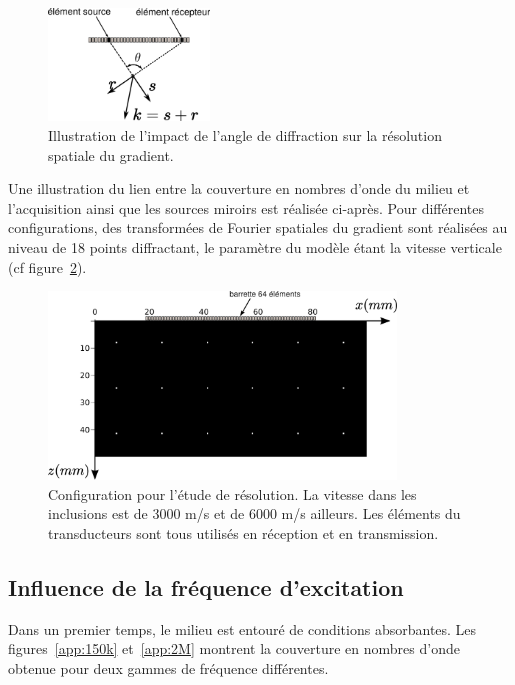 \begin{figure}[!h]
	\centering
	\includegraphics[height=3cm]{img/reso.png}
	\caption{Illustration de l'impact de l'angle de diffraction sur la résolution spatiale du gradient.\label{app:k1}}
\end{figure}


Une illustration du lien entre la couverture en nombres d'onde du milieu et l'acquisition ainsi que les sources miroirs est réalisée ci-après. Pour différentes configurations, des transformées de Fourier spatiales du gradient sont réalisées au niveau de 18 points diffractant, le paramètre du modèle étant la vitesse verticale (cf figure~\ref{app:config_reso}).

\begin{figure}[!h]
	\centering
	\includegraphics[height=5cm]{img/vp_scat.png}
	\caption{Configuration pour l'étude de résolution. La vitesse dans les inclusions est de 3000 m/s et de 6000 m/s ailleurs. Les éléments du transducteurs sont tous utilisés en réception et en transmission. \label{app:config_reso}}
\end{figure}


\subsection{Influence de la fréquence d'excitation}

Dans un premier temps, le milieu est entouré de conditions absorbantes. Les figures~\ref{app:150k} et~\ref{app:2M} montrent la couverture en nombres d'onde obtenue pour deux gammes de fréquence différentes. 
    
